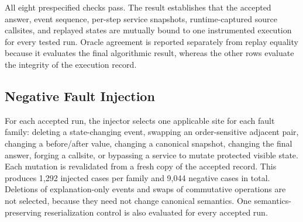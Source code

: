 \documentclass[letterpaper]{article}
\begin{document}
All eight prespecified checks pass. The result establishes that the
accepted answer, event sequence, per-step service snapshots, runtime-captured source callsites,
and replayed states are mutually bound to one instrumented execution
for every tested run. Oracle agreement is reported separately from
replay equality because it evaluates the final algorithmic result,
whereas the other rows evaluate the integrity of the execution record.

\subsection{Negative Fault Injection}

For each accepted run, the injector selects one applicable site for
each fault family: deleting a state-changing event, swapping an
order-sensitive adjacent pair, changing a before/after value, changing
a canonical snapshot, changing the final answer, forging a callsite, or
bypassing a service to mutate protected visible state. Each mutation is
revalidated from a fresh copy of the accepted record. This produces
1,292 injected cases per family and 9,044 negative cases in total.
Deletions of explanation-only events and swaps of commutative
operations are not selected, because they need not change canonical
semantics. One semantics-preserving reserialization control is also
evaluated for every accepted run.
\end{document}
